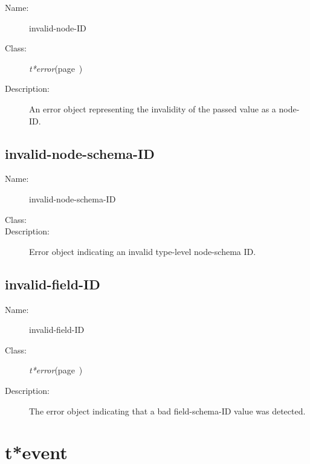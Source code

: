 \begin{description}
\item [Name:]  invalid-node-ID

\item [Class:] {\sl t*error}\hfill(page~\pageref{t*error})

\item [Description:]

An error object representing the invalidity of the 
passed value as a node-ID.


\end{description}
\horizontalline

\subsection{invalid-node-schema-ID}
\label{invalid-node-schema-ID}

\begin{description}
\item [Name:]  invalid-node-schema-ID

\item [Class:]

\item [Description:]

Error object indicating an invalid type-level node-schema
ID.


\end{description}
\horizontalline

\subsection{invalid-field-ID}
\label{invalid-field-ID}

\begin{description}
\item [Name:]  invalid-field-ID

\item [Class:] {\sl t*error}\hfill(page~\pageref{t*error})

\item [Description:]

The error object indicating that a bad field-schema-ID
value was detected.


\end{description}
\horizontalline

\section{t*event}
\label{t*event}

